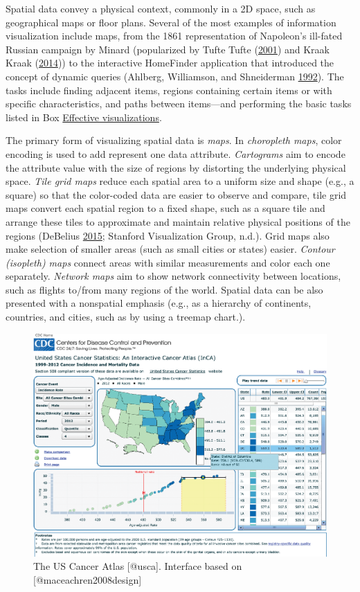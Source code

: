 \documentclass[]{krantz}
\begin{document}
Spatial data convey a physical context, commonly in a 2D space, such as
geographical maps or floor plans. Several of the most examples of
information visualization include maps, from the 1861 representation of
Napoleon's ill-fated Russian campaign by Minard (popularized by Tufte
Tufte (\protect\hyperlink{ref-edward2001visual}{2001}) and Kraak Kraak
(\protect\hyperlink{ref-Kraak2014}{2014})) to the interactive HomeFinder
application that introduced the concept of dynamic queries (Ahlberg,
Williamson, and Shneiderman
\protect\hyperlink{ref-ahlberg1992dynamic}{1992}). The tasks include
finding adjacent items, regions containing certain items or with
specific characteristics, and paths between items---and performing the
basic tasks listed in Box \protect\hyperlink{box:viz1}{Effective
visualizations}.

The primary form of visualizing spatial data is \emph{maps}. In
\emph{choropleth maps}, color encoding is used to add represent one data
attribute. \emph{Cartograms} aim to encode the attribute value with the
size of regions by distorting the underlying physical space. \emph{Tile
grid maps} reduce each spatial area to a uniform size and shape (e.g., a
square) so that the color-coded data are easier to observe and compare,
tile grid maps convert each spatial region to a fixed shape, such as a
square tile and arrange these tiles to approximate and maintain relative
physical positions of the regions (DeBelius
\protect\hyperlink{ref-DeBelius2015}{2015}; Stanford Visualization
Group, n.d.). Grid maps also make selection of smaller areas (such as
small cities or states) easier. \emph{Contour (isopleth) maps} connect
areas with similar measurements and color each one separately.
\emph{Network maps} aim to show network connectivity between locations,
such as flights to/from many regions of the world. Spatial data can be
also presented with a nonspatial emphasis (e.g., as a hierarchy of
continents, countries, and cities, such as by using a treemap chart.).

\begin{figure}

{\centering \includegraphics[width=0.9\linewidth]{ChapterViz/figures/fig9-5} 

}

\caption{The US Cancer Atlas [@usca]. Interface based on [@maceachren2008design]}\label{fig:fig9-5}
\end{figure}
\end{document}
